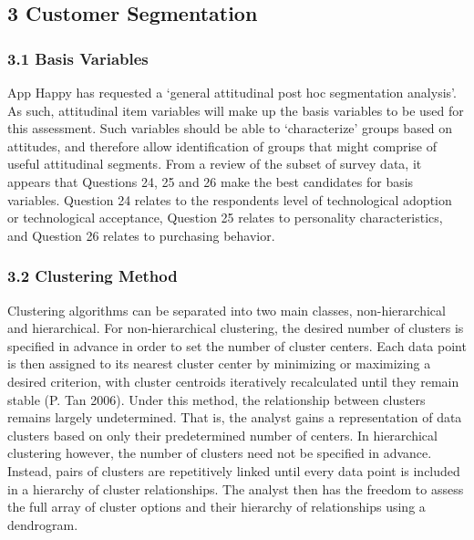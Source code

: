 \documentclass[]{article}
\begin{document}
\subsection{3 Customer Segmentation}\label{customer-segmentation}

\subsubsection{3.1 Basis Variables}\label{basis-variables}

App Happy has requested a `general attitudinal post hoc segmentation
analysis'. As such, attitudinal item variables will make up the basis
variables to be used for this assessment. Such variables should be able
to `characterize' groups based on attitudes, and therefore allow
identification of groups that might comprise of useful attitudinal
segments. From a review of the subset of survey data, it appears that
Questions 24, 25 and 26 make the best candidates for basis variables.
Question 24 relates to the respondents level of technological adoption
or technological acceptance, Question 25 relates to personality
characteristics, and Question 26 relates to purchasing behavior.

\subsubsection{3.2 Clustering Method}\label{clustering-method}

Clustering algorithms can be separated into two main classes,
non-hierarchical and hierarchical. For non-hierarchical clustering, the
desired number of clusters is specified in advance in order to set the
number of cluster centers. Each data point is then assigned to its
nearest cluster center by minimizing or maximizing a desired criterion,
with cluster centroids iteratively recalculated until they remain stable
(P. Tan 2006). Under this method, the relationship between clusters
remains largely undetermined. That is, the analyst gains a
representation of data clusters based on only their predetermined number
of centers. In hierarchical clustering however, the number of clusters
need not be specified in advance. Instead, pairs of clusters are
repetitively linked until every data point is included in a hierarchy of
cluster relationships. The analyst then has the freedom to assess the
full array of cluster options and their hierarchy of relationships using
a dendrogram.
\end{document}
